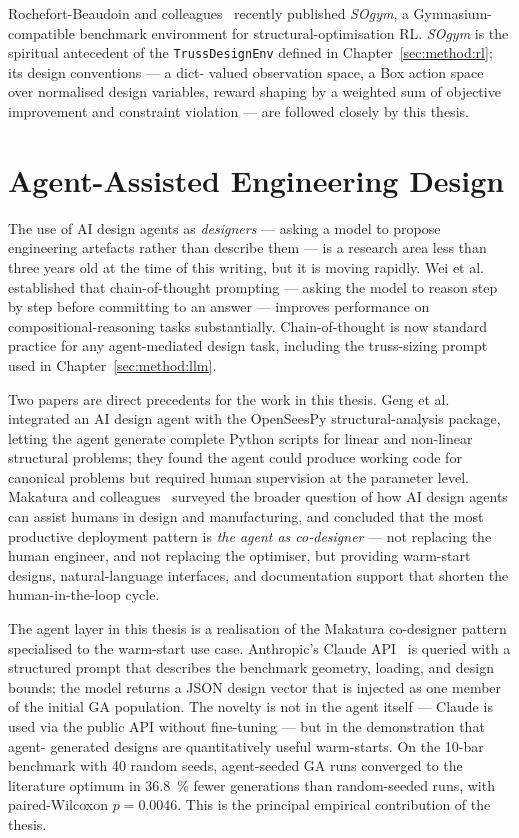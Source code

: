 Rochefort-Beaudoin and colleagues~\cite{rochefort2024sogym}
recently published \emph{SOgym}, a Gymnasium-compatible benchmark
environment for structural-optimisation RL. \emph{SOgym} is the
spiritual antecedent of the \texttt{TrussDesignEnv} defined in
Chapter~\ref{sec:method:rl}; its design conventions --- a dict-
valued observation space, a Box action space over normalised
design variables, reward shaping by a weighted sum of objective
improvement and constraint violation --- are followed closely by
this thesis.

\section{Agent-Assisted Engineering Design}
\label{sec:lit:llm}

The use of AI design agents as \emph{designers} --- asking a
model to propose engineering artefacts rather than describe them
--- is a research area less than three years old at the time of
this writing, but it is moving rapidly. Wei et
al.~\cite{wei2022cot} established that chain-of-thought prompting
--- asking the model to reason step by step before committing to
an answer --- improves performance on compositional-reasoning
tasks substantially. Chain-of-thought is now standard practice for
any agent-mediated design task, including the truss-sizing prompt
used in Chapter~\ref{sec:method:llm}.

Two papers are direct precedents for the work in this thesis.
Geng et al.~\cite{geng2024} integrated an AI design agent with
the OpenSeesPy structural-analysis package, letting the agent
generate complete Python scripts for linear and non-linear
structural problems; they found the agent could produce working
code for canonical problems but required human supervision at the
parameter level. Makatura and colleagues~\cite{makatura2024}
surveyed the broader question of how AI design agents can
assist humans in design and manufacturing, and concluded that
the most productive deployment pattern is \emph{the agent as
co-designer} --- not replacing the human engineer, and not
replacing the optimiser, but providing warm-start designs,
natural-language interfaces, and documentation support that shorten
the human-in-the-loop cycle.

The agent layer in this thesis is a realisation of the Makatura
co-designer pattern specialised to the warm-start use case.
Anthropic's Claude API~\cite{anthropic-docs} is queried with a
structured prompt that describes the benchmark geometry, loading,
and design bounds; the model returns a JSON design vector that is
injected as one member of the initial GA population. The novelty
is not in the agent itself --- Claude is used via the public API
without fine-tuning --- but in the demonstration that agent-
generated designs are quantitatively useful warm-starts. On the
10-bar benchmark with \num{40} random seeds, agent-seeded GA runs
converged to the literature optimum in \num{36.8}~\% fewer
generations than random-seeded runs, with paired-Wilcoxon
$p = \num{0.0046}$. This is the principal empirical contribution
of the thesis.


